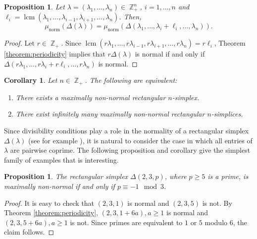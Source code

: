\documentclass[a4paper,11pt]{amsart}
\theoremstyle{plain}
\newtheorem{corollary}[theorem]{Corollary}
\newtheorem{proposition}[theorem]{Proposition}
\theoremstyle{definition}
\theoremstyle{remark}
\DeclareMathOperator{\ZZ}{\mathbb{Z}}
\DeclareMathOperator{\lcm}{lcm}
\DeclareMathOperator{\norm}{norm}
\begin{document}
\begin{proposition}\label{proposition:periodicity-normality-indices}
    Let $\lambda = (\lambda_1, \ldots, \lambda_n) \in \ZZ_+^n$, $i = 1, \ldots, n$ and $\ell_i = \lcm(\lambda_1, \ldots, \lambda_{i - 1}, \lambda_{i + 1}, \ldots, \lambda_n)$. Then,
    \[
    \mu_{\norm}(\Delta(\lambda)) = \mu_{\norm}(\Delta(\lambda_1, \ldots, \lambda_i + \ell_i, \ldots, \lambda_n)).
    \]
\end{proposition}

\begin{proof}
    Let $r \in \ZZ_+$. Since $\lcm(r\lambda_1, \ldots, r\lambda_{i - 1}, r\lambda_{i + 1}, \ldots, r\lambda_n) = r\ell_i$, Theorem \ref{theorem:periodicity} implies that $r\Delta(\lambda)$ is normal if and only if $\Delta(r\lambda_1, \ldots, r\lambda_i + r\ell_i, \ldots, r\lambda_n)$ is normal.
\end{proof}

\begin{corollary}\label{corollary:infinitely-many-maximally-non-normal-characterisation}
    Let $n \in \ZZ_+$. The following are equivalent:
    \begin{enumerate}[1.]
        \item There exists a maximally non-normal rectangular $n$-simplex.
        \item There exist infinitely many maximally non-normal rectangular $n$-simplices.
    \end{enumerate}
\end{corollary}

Since divisibility conditions play a role in the normality of a rectangular simplex $\Delta(\lambda)$ (see for example \cite[Proposition 2.1, Proposition 2.4]{BrunsGubeladze:1999}), it is natural to consider the case in which all entries of $\lambda$ are pairwise coprime. The following proposition and corollary give the simplest family of examples that is interesting.

\begin{proposition}
    The rectangular simplex $\Delta(2, 3, p)$, where $p \geq 5$ is a prime, is maximally non-normal if and only if $p \equiv -1 \mod 3$.
\end{proposition}

\begin{proof}
    It is easy to check that $(2, 3, 1)$ is normal and $(2, 3, 5)$ is not. By Theorem \ref{theorem:periodicity}, $(2, 3, 1 + 6a), a \geq 1$ is normal and $(2, 3, 5 + 6a), a \geq 1$ is not. Since primes are equivalent to $1$ or $5$ modulo 6, the claim follows.
\end{proof}
\end{document}
